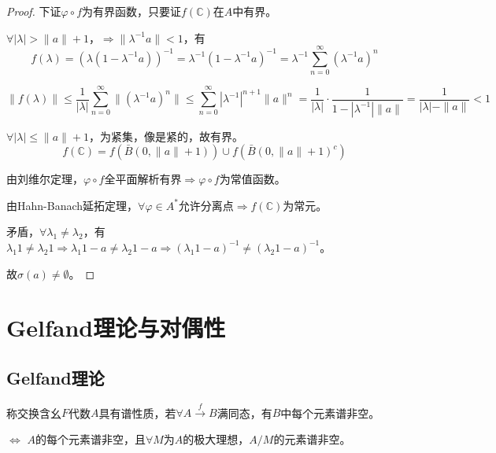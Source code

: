 \documentclass[lang=cn,a4paper,newtx,section]{elegantbook}
\begin{document}
\begin{proof}
  下证$\varphi \circ f$为有界函数，只要证$f(\mathbb{C})$在$A$中有界。
  
  $\forall |\lambda| > \|a\| + 1$，$\Rightarrow \|\lambda^{-1}a\| < 1$，有
  \begin{equation*}
    f(\lambda) = (\lambda(1 - \lambda^{-1}a))^{-1} = \lambda^{-1}(1 - \lambda^{-1}a)^{-1} = \lambda^{-1}\sum_{n=0}^{\infty}(\lambda^{-1}a)^n
  \end{equation*}
  
  \begin{equation*}
    \|f(\lambda)\| \leq \frac{1}{|\lambda|}\sum_{n=0}^{\infty}\|(\lambda^{-1}a)^n\| \leq \sum_{n=0}^{\infty}|\lambda^{-1}|^{n+1}\|a\|^n = \frac{1}{|\lambda|} \cdot \frac{1}{1 - |\lambda^{-1}|\|a\|} = \frac{1}{|\lambda| - \|a\|} < 1
  \end{equation*}
  
  $\forall |\lambda| \leq \|a\| + 1$，为紧集，像是紧的，故有界。
  \begin{equation*}
    f(\mathbb{C}) = f(\bar{B}(0, \|a\|+1)) \cup f(\bar{B}(0, \|a\|+1)^c)
  \end{equation*}
  
  由刘维尔定理，$\varphi \circ f$全平面解析有界$\Rightarrow \varphi \circ f$为常值函数。
  
  由Hahn-Banach延拓定理，$\forall \varphi \in A^*$允许分离点$\Rightarrow f(\mathbb{C})$为常元。
  
  矛盾，$\forall \lambda_1 \neq \lambda_2$，有$\lambda_1 1 \neq \lambda_2 1 \Rightarrow \lambda_1 1 - a \neq \lambda_2 1 - a \Rightarrow (\lambda_1 1 - a)^{-1} \neq (\lambda_2 1 - a)^{-1}$。
  
  故$\sigma(a) \neq \emptyset$。
\end{proof}


\chapter{Gelfand理论与对偶性}

\section{Gelfand理论}

\begin{remark}
  称交换含幺$F$代数$A$具有谱性质，若$\forall A \xrightarrow{f} B$满同态，有$B$中每个元素谱非空。
  
  $\Longleftrightarrow$ $A$的每个元素谱非空，且$\forall M$为$A$的极大理想，$A/M$的元素谱非空。
\end{remark}
\end{document}
